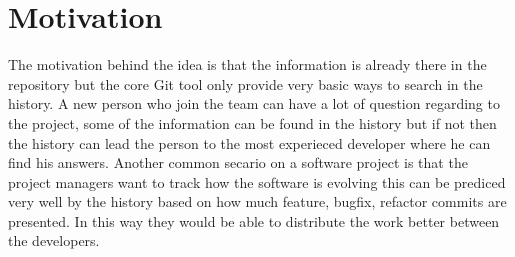 \section{Motivation}
The motivation behind the idea is that the information is already there in the repository but the core Git tool only provide very basic ways to search in the history.\newline
A new person who join the team can have a lot of question regarding to the project, some of the information can be found in the history but if not then the history can lead the person to the most experieced developer where he can find his answers.\newline
Another common secario on a software project is that the project managers want to track how the software is evolving this can be prediced very well by the history based on how much feature, bugfix, refactor commits are presented. In this way they would be able to distribute the work better between the developers.